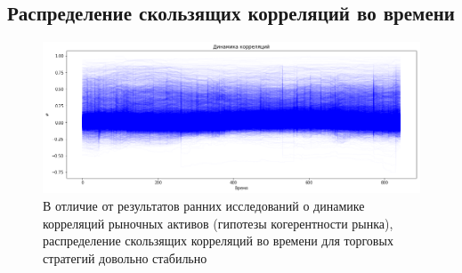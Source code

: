 \documentclass{article}
\begin{document}
\subsection{Распределение скользящих корреляций во времени}
\begin{figure}[h]
	\includegraphics[width=\linewidth]{correlations}
	\caption{В отличие от результатов ранних исследований о динамике корреляций рыночных активов (гипотезы когерентности рынка), распределение скользящих корреляций во времени для торговых стратегий довольно стабильно}
\end{figure}
\end{document}
